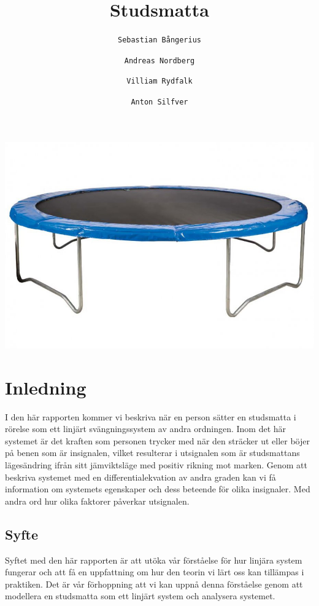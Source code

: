 \documentclass[10pt,a4paper]{article}
\author{
  \texttt{Sebastian Bångerius}
  \and
  \texttt{Andreas Nordberg}
  \and
  \texttt{Villiam Rydfalk}
  \and
  \texttt{Anton Silfver}
}
\begin{document}

\title{Studsmatta}
\maketitle

\includegraphics[scale=0.35]{Framsida}


\cleardoublepage

\tableofcontents

\clearpage

\section{Inledning}
\setcounter{page}{3}

I den här rapporten kommer vi beskriva när en person sätter en studsmatta i rörelse som ett linjärt svängningssystem av andra ordningen. Inom det här systemet är det kraften som personen trycker med när den sträcker ut eller böjer på benen som är insignalen, vilket resulterar i utsignalen som är studsmattans lägesändring ifrån sitt jämviktsläge med positiv rikning mot marken. Genom att beskriva systemet med en differentialekvation av andra graden kan vi få information om systemets egenskaper och dess beteende för olika insignaler. Med andra ord hur olika faktorer påverkar utsignalen.

\subsection{Syfte}
Syftet med den här rapporten är att utöka vår förståelse för hur linjära system fungerar och att få en uppfattning om hur den teorin vi lärt oss kan tillämpas i praktiken. Det är vår förhoppning att vi kan uppnå denna förståelse genom att modellera en studsmatta som ett linjärt system och analysera systemet.
\end{document}

